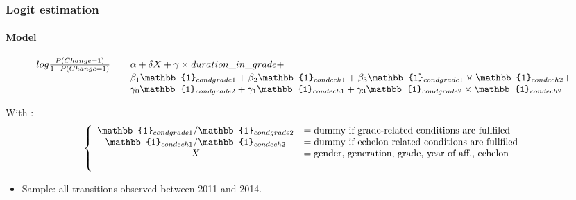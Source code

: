 \documentclass[xcolor=table,ignorenonframetext,12pt]{beamer}
\newenvironment{choixmarges}[2]{\begin{list}{}{%
\setlength{\topsep}{0pt}%
\setlength{\leftmargin}{0pt}%
\setlength{\rightmargin}{0pt}%
\setlength{\listparindent}{\parindent}%
\setlength{\itemindent}{\parindent}%
\setlength{\parsep}{0pt plus 1pt}%
\addtolength{\leftmargin}{#1}%
\addtolength{\rightmargin}{#2}%
}\item }{\end{list}}
\begin{document}
\begin{frame}
\frametitle{Logit estimation}
\framesubtitle{Model}
\begin{choixmarges}{-0.7cm}{-0.7cm}

\small
\begin{equation*}
\begin{array}{c l}
log \frac{P(Change=1)}{1 - P(Change=1)} =& \alpha  + \delta X + \gamma \times duration\_in\_grade + \\
			& \beta_1 \mathbb{1}_{{cond grade 1}} + \beta_2 \mathbb{1}_{{cond ech 1}} +  \beta_3 \mathbb{1}_{{cond grade 1}} \times \mathbb{1}_{{cond ech 2}} +  \\
			& \gamma_0 \mathbb{1}_{{cond grade 2}} + \gamma_1 \mathbb{1}_{{cond ech 1}} + \gamma_3  \mathbb{1}_{{cond grade 2}} \times \mathbb{1}_{{cond ech 2}} 
\end{array} 
\end{equation*}

With :
\vspace{-0.1cm}
\begin{equation*}
\left\{\begin{array}{c  l}
\mathbb{1}_{{cond grade 1}} /\mathbb{1}_{{cond grade 2}}  &= \text{dummy if grade-related conditions are fullfiled}  \\
\mathbb{1}_{{cond ech 1}} / \mathbb{1}_{{cond ech 2}} &= \text{dummy if echelon-related conditions are fullfiled}  \\
X &= \text{gender, generation, grade, year of aff., echelon} \\
 &~~ \text{} 
\end{array} \right.  
\end{equation*}
\normalsize
\vspace{0.1 cm}

\begin{itemize}
\item Sample: all transitions observed between 2011 and 2014.

\end{itemize}

\end{choixmarges}

\end{frame}
\end{document}
